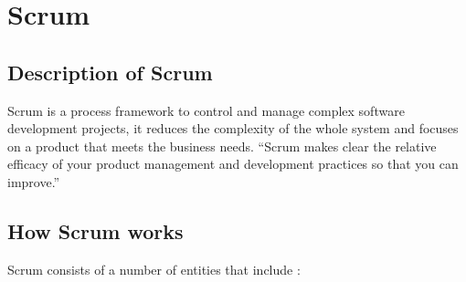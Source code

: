 \section{Scrum}

\subsection{Description of Scrum}
Scrum is a process framework to control and manage complex software development projects, it reduces the complexity of the whole system and focuses on a product that meets the business needs. ``Scrum makes clear the relative efficacy of your product management and development practices so that you can improve.'' \autocite{ScrumGuide}

\subsection{How Scrum works}
Scrum consists of a number of entities that include \autocite{WhatIsScrum}:
